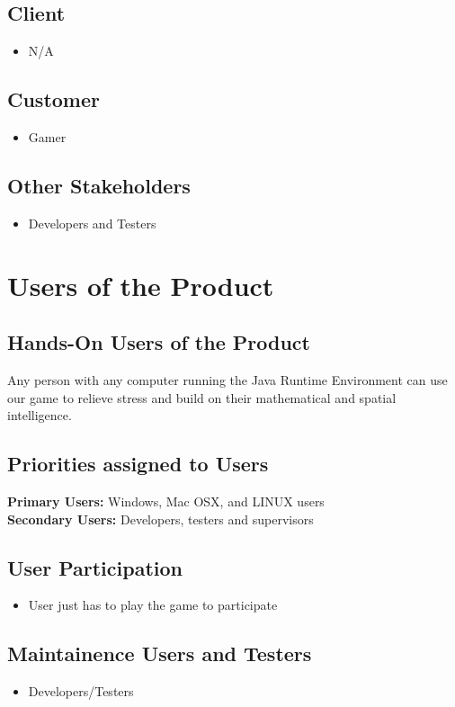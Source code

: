 \documentclass[12pt]{article}
\begin{document}
\subsection{Client}
\begin{itemize}
\item N/A
\end{itemize}
\subsection{Customer}
\begin{itemize}
\item Gamer
\end{itemize}
\subsection{Other Stakeholders}
\begin{itemize}
\item Developers and Testers
\end{itemize}

\section{Users of the Product}
\subsection{Hands-On Users of the Product}
\par\indent\indent Any person with any computer running the Java Runtime Environment can use our game to
relieve stress and build on their mathematical and spatial intelligence.
\subsection{Priorities assigned to Users}
\textbf{Primary Users:} Windows, Mac OSX, and LINUX users
\\
\textbf{Secondary Users:} Developers, testers and supervisors

\subsection{User Participation}
\begin{itemize}
\item User just has to play the game to participate
\end{itemize}
\subsection{Maintainence Users and Testers}
\begin{itemize}
\item Developers/Testers
\end{itemize}
\end{document}
